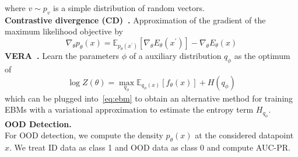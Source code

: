 \documentclass[landscape,a0paper,fontscale=0.292]{baposter}
\begin{document}
\begin{poster}
{\begin{minipage}[t]{0.48\linewidth}
        where \(v \sim p_v\) is a simple distribution of random vectors. \\
        \textbf{Contrastive divergence (CD)~\cite{hintonTrainingProductsExperts2002}.}
        Approximation of the gradient of the maximum likelihood objective by
        \begin{equation}
        \label{eq:cd}
            \nabla_\theta p_\theta(x) = \mathbb{E}_{p_\theta(x^\prime)} \left[ \nabla_\theta E_\theta(x^\prime) \right] - \nabla_\theta E_\theta(x)
        \end{equation}
        \textbf{VERA~\cite{grathwohlNoMCMCMe2020}.}
        Learn the parameters \(\phi \) of a auxiliary distribution \(q_\phi \) as the optimum of
        \begin{equation}
            \log Z(\theta) = \max_{q_\phi} \mathbb{E}_{q_\phi(x)} \left[ f_\theta(x) \right] + H(q_\phi)
        \end{equation}
        which can be plugged into~\ref{eq:ebm} to obtain an alternative method for training EBMs with a variational approximation to estimate the entropy term \(H_{q_\phi}\).\\

        \textbf{OOD Detection.}\\ 
        For OOD detection, we compute the density \(p_\theta(x)\) at the considered datapoint \(x\). We treat ID data as class 1 and OOD data as class 0 and compute AUC-PR.
    \end{minipage}
}



\end{poster}
\end{document}
